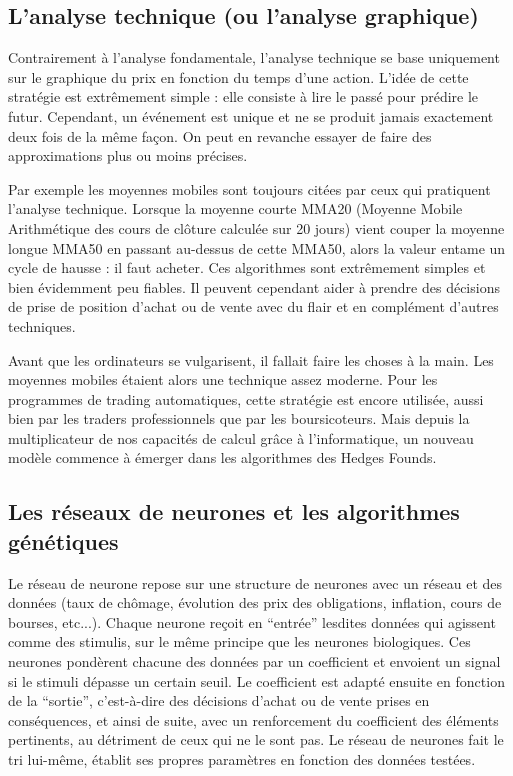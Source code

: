 \documentclass[a4paper,12pt]{article}
\begin{document}
\subsection{L'analyse technique (ou l'analyse graphique)}
Contrairement à l'analyse fondamentale, l'analyse technique se base uniquement sur le graphique du prix en fonction du temps d'une action. L'idée de cette stratégie est extrêmement simple : elle consiste à lire le passé pour prédire le futur. Cependant, un événement est unique et ne se produit jamais exactement deux fois de la même façon. On peut en revanche essayer de faire des approximations plus ou moins précises. 

Par exemple les moyennes mobiles sont toujours citées par ceux qui pratiquent l'analyse technique. Lorsque la moyenne courte MMA20 (Moyenne Mobile Arithmétique des cours de clôture calculée sur 20 jours) vient couper la moyenne longue MMA50 en passant au-dessus de cette MMA50, alors la valeur entame un cycle de hausse : il faut acheter. Ces algorithmes sont extrêmement simples et bien évidemment peu fiables. Il peuvent cependant aider à prendre des décisions de prise de position d'achat ou de vente avec du flair et en complément d'autres techniques. 

Avant que les ordinateurs se vulgarisent, il fallait faire les choses à la main. Les moyennes mobiles étaient alors une technique assez moderne. Pour les programmes de trading automatiques, cette stratégie est encore utilisée, aussi bien par les traders professionnels que par les boursicoteurs. Mais depuis la multiplicateur de nos capacités de calcul grâce à l'informatique, un nouveau modèle commence à émerger dans les algorithmes des Hedges Founds.

\subsection{Les réseaux de neurones et les algorithmes génétiques}

Le réseau de neurone repose sur une structure de neurones avec un réseau et des données (taux de chômage, évolution des prix des obligations, inflation, cours de bourses, etc...). Chaque neurone reçoit en “entrée” lesdites données qui agissent comme des stimulis, sur le même principe que les neurones biologiques. Ces neurones pondèrent chacune des données par un coefficient et envoient un signal si le stimuli dépasse un certain seuil. Le coefficient est adapté ensuite en fonction de la “sortie”, c’est-à-dire des décisions d’achat ou de vente prises en conséquences, et ainsi de suite, avec un renforcement du coefficient des éléments pertinents, au détriment de ceux qui ne le sont pas. Le réseau de neurones fait le tri lui-même, établit ses propres paramètres en fonction des données testées.
\end{document}
